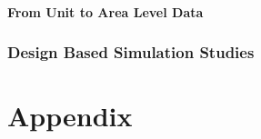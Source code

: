 \subsection{From Unit to Area Level Data}


\section{Design Based Simulation Studies}



\appendix

\part{Appendix} %



\cleardoublepage %





